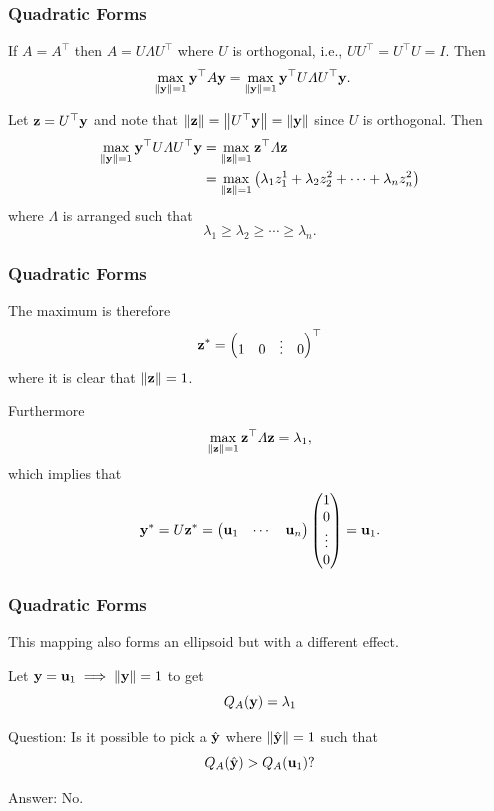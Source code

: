 \documentclass{beamer}
\begin{document}
\begin{frame}\frametitle{Quadratic Forms}
	If $A=A^\top $ then $A=U\Lambda U^\top $ where $U$ is orthogonal, i.e., $UU^\top =U^\top U=I$.
	Then
	\begin{align*}
		\max_{\left\|\mathbf{y}\right\|=1} \mathbf{y}^\top  A \mathbf{y} 
			&= \max_{\left\|\mathbf{y}\right\|=1} \mathbf{y}^\top  U \Lambda U^\top  \mathbf{y}.	
	\end{align*}
	
	\vfill

	Let $\mathbf{z}=U^\top  \mathbf{y}$ and note that $\left\|\mathbf{z}\right\|=\left\|U^\top  \mathbf{y}\right\| = \left\|\mathbf{y}\right\|$ since $U$ is orthogonal.
	Then 
	\begin{align*}
		\max_{\left\|\mathbf{y}\right\|=1} \mathbf{y}^\top  U \Lambda U^\top  \mathbf{y} 
			&= \max_{\left\|\mathbf{z}\right\|=1} \mathbf{z}^\top  \Lambda \mathbf{z} \\
			&= \max_{\left\|\mathbf{z}\right\|=1} \left( \lambda_1 z_1^1 + \lambda_2 z_2^2 + \cdots + \lambda_n z_n^2 \right)	
	\end{align*}
	where $\Lambda$ is arranged such that
	\[
	\lambda_1 \geq \lambda_2 \geq \cdots \geq \lambda_n.
	\]
\end{frame}

\begin{frame}\frametitle{Quadratic Forms}
	The maximum is therefore 
	\[
	\mathbf{z}^\ast = \begin{pmatrix} 1 & 0 & \vdots & 0 \end{pmatrix}^\top
	\]
	where it is clear that $\left\|\mathbf{z}\right\|=1$.
	
	Furthermore
	\[
		\max_{\left\|\mathbf{z}\right\|=1} \mathbf{z}^\top  \Lambda \mathbf{z} = \lambda_1,
	\]
	which implies that
	\[
	\mathbf{y}^\ast = U\mathbf{z}^\ast = \begin{pmatrix} \mathbf{u}_1 & \cdots & \mathbf{u}_n \end{pmatrix} \begin{pmatrix} 1 \\ 0 \\ \vdots \\ 0 \end{pmatrix} = \mathbf{u}_1.
	\]	
\end{frame}

\begin{frame}\frametitle{Quadratic Forms}
	This mapping also forms an ellipsoid but with a different effect.
	
	Let $\mathbf{y} = \mathbf{u}_1 \implies \left\|\mathbf{y}\right\| = 1 $ to get
	\[ 
		Q_A(\mathbf{y}) = \lambda_1 
	\]
	
	\vfill
	
	{\color{blue}Question:} 
	Is it possible to pick a $\hat{\mathbf{y}}$ where $\left\|\hat{\mathbf{y}}\right\| = 1$ such that 
	\[
		Q_A(\hat{\mathbf{y}}) > Q_A(\mathbf{u}_1)?
	\]
	
	\vfill
	
	{\color{blue}Answer:} No.
	
\end{frame}
\end{document}
